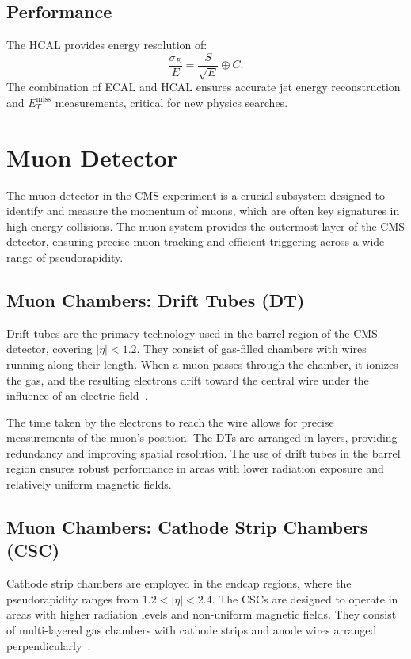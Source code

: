\subsection{Performance}
The HCAL provides energy resolution of:~\cite{cms_tdr_hcal}
\[
\frac{\sigma_E}{E} = \frac{S}{\sqrt{E}} \oplus C.
\]
The combination of ECAL and HCAL ensures accurate jet energy reconstruction and $E_T^{\text{miss}}$ measurements, critical for new physics searches.

\section{Muon Detector}
The muon detector in the CMS experiment is a crucial subsystem designed to identify and measure the momentum of muons, which are often key signatures in high-energy collisions. The muon system provides the outermost layer of the CMS detector, ensuring precise muon tracking and efficient triggering across a wide range of pseudorapidity.

\subsection{Muon Chambers: Drift Tubes (DT)}
Drift tubes are the primary technology used in the barrel region of the CMS detector, covering $|\eta| < 1.2$. They consist of gas-filled chambers with wires running along their length. When a muon passes through the chamber, it ionizes the gas, and the resulting electrons drift toward the central wire under the influence of an electric field~\cite{muon_tdr}.

The time taken by the electrons to reach the wire allows for precise measurements of the muon's position. The DTs are arranged in layers, providing redundancy and improving spatial resolution. The use of drift tubes in the barrel region ensures robust performance in areas with lower radiation exposure and relatively uniform magnetic fields.

\subsection{Muon Chambers: Cathode Strip Chambers (CSC)}
Cathode strip chambers are employed in the endcap regions, where the pseudorapidity ranges from $1.2 < |\eta| < 2.4$. The CSCs are designed to operate in areas with higher radiation levels and non-uniform magnetic fields. They consist of multi-layered gas chambers with cathode strips and anode wires arranged perpendicularly~\cite{muon_tdr}.

